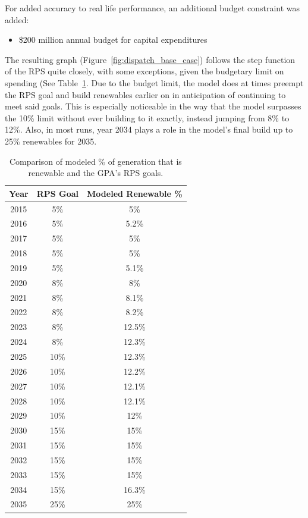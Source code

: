 \documentclass[12pt,letterpaper,fleqn]{article}
\begin{document}
For added accuracy to real life performance, an additional budget
constraint was added:
\begin{itemize}
\item \$200 million annual budget for capital expenditures
\end{itemize}

The resulting graph (Figure~\ref{fig:dispatch_base_case}) follows the
step function of the RPS quite closely, with some exceptions, given
the budgetary limit on spending (See Table~\ref{tab:rps}. Due to the
budget limit, the model does at times preempt the RPS goal and build
renewables earlier on in anticipation of continuing to meet said
goals. This is especially noticeable in the way that the model
surpasses the 10\% limit without ever building to it exactly, instead
jumping from 8\% to 12\%. Also, in most runs, year 2034 plays a role
in the model’s final build up to 25\% renewables for 2035.

\begin{table}[!h]
  \begin{center}
    \begin{tabular}{| c | c | c | }
      \hline
      \textbf{Year} & \textbf{RPS Goal} & \textbf{Modeled Renewable
        \%} \\\hline
      2015 & 5\% & 5\% \\\hline
      2016 & 5\% & 5.2\% \\\hline
      2017 & 5\% & 5\% \\\hline
      2018 & 5\% & 5\% \\\hline
      2019 & 5\% & 5.1\% \\\hline
      2020 & 8\% & 8\% \\\hline
      2021 & 8\% & 8.1\% \\\hline
      2022 & 8\% & 8.2\% \\\hline
      2023 & 8\% & 12.5\% \\\hline
      2024 & 8\% & 12.3\% \\\hline
      2025 & 10\% & 12.3\% \\\hline
      2026 & 10\% & 12.2\% \\\hline
      2027 & 10\% & 12.1\% \\\hline
      2028 & 10\% & 12.1\% \\\hline
      2029 & 10\% & 12\% \\\hline
      2030 & 15\% & 15\% \\\hline
      2031 & 15\% & 15\% \\\hline
      2032 & 15\% & 15\% \\\hline
      2033 & 15\% & 15\% \\\hline
      2034 & 15\% & 16.3\% \\\hline
      2035 & 25\% & 25\% \\\hline
    \end{tabular}
  \end{center}
  \caption{Comparison of modeled \% of generation that is renewable
    and the GPA's RPS goals.}
  \label{tab:rps}
\end{table}
\end{document}
